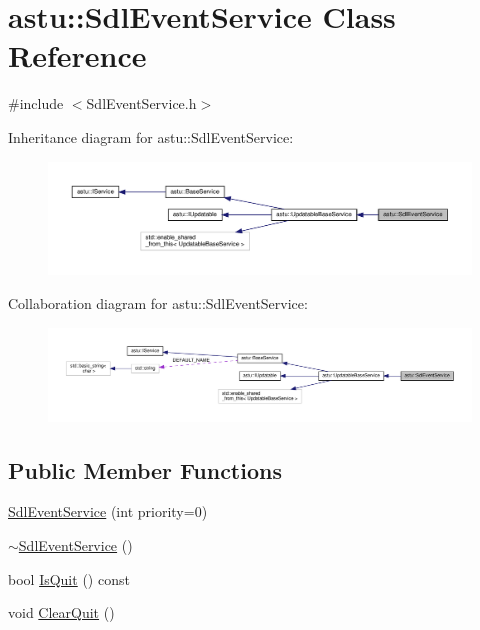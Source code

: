 \hypertarget{classastu_1_1SdlEventService}{}\section{astu\+:\+:Sdl\+Event\+Service Class Reference}
\label{classastu_1_1SdlEventService}


{\ttfamily \#include $<$Sdl\+Event\+Service.\+h$>$}



Inheritance diagram for astu\+:\+:Sdl\+Event\+Service\+:\nopagebreak
\begin{figure}[H]
\begin{center}
\leavevmode
\includegraphics[width=350pt]{classastu_1_1SdlEventService__inherit__graph}
\end{center}
\end{figure}


Collaboration diagram for astu\+:\+:Sdl\+Event\+Service\+:\nopagebreak
\begin{figure}[H]
\begin{center}
\leavevmode
\includegraphics[width=350pt]{classastu_1_1SdlEventService__coll__graph}
\end{center}
\end{figure}
\subsection*{Public Member Functions}
\begin{DoxyCompactItemize}
\item 
\hyperlink{classastu_1_1SdlEventService_ad8da3cc63eb9810ba27a80bfeb68122d}{Sdl\+Event\+Service} (int priority=0)
\item 
\hyperlink{classastu_1_1SdlEventService_a388605cdc2ed3eb6fc70d2a020047552}{$\sim$\+Sdl\+Event\+Service} ()
\item 
bool \hyperlink{classastu_1_1SdlEventService_ac7b0eaae46bff34cc0d305a3dc3cea68}{Is\+Quit} () const
\item 
void \hyperlink{classastu_1_1SdlEventService_afe744162d9089344bfc32f6d65111ff6}{Clear\+Quit} ()
\end{DoxyCompactItemize}
